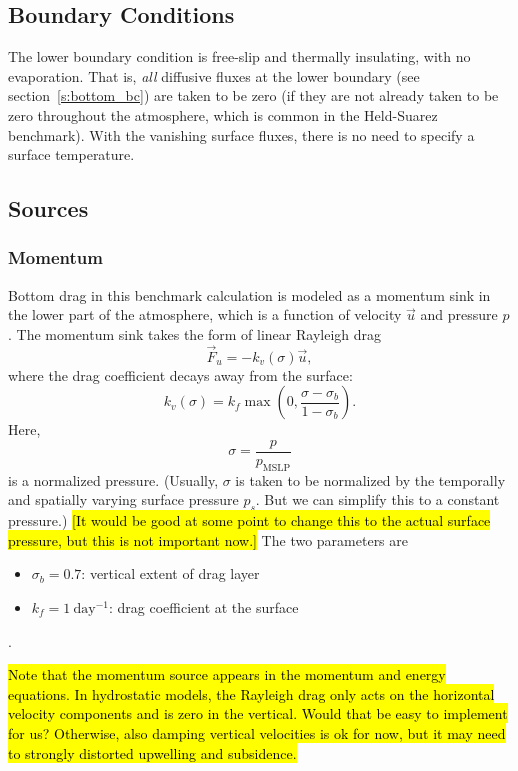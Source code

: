 \documentclass{report}
\begin{document}
\subsection{Boundary Conditions}

The lower boundary condition is free-slip and thermally insulating, with no evaporation. That is, \emph{all} diffusive fluxes at the lower boundary (see section~\ref{s:bottom_bc}) are taken to be zero (if they are not already taken to be zero throughout the atmosphere, which is common in the Held-Suarez benchmark). With the vanishing surface fluxes, there is no need to specify a surface temperature.

\subsection{Sources}

\subsubsection{Momentum} 

Bottom drag in this benchmark calculation is modeled as a momentum sink in the lower part of the atmosphere, which is a function of velocity $\vec{u}$ and pressure $p$. The momentum sink takes the form of linear Rayleigh drag
\begin{equation}
    \vec{F}_u = -k_v(\sigma) \vec{u},
\end{equation}
where the drag coefficient decays away from the surface:
\begin{equation}
    k_v(\sigma) = k_f \max \left( 0, \frac{\sigma - \sigma_b}{1-\sigma_b} \right).
\end{equation}
Here,
\[
\sigma = \frac{p}{p_{\mathrm{MSLP}}}
\]
is a normalized pressure. (Usually, $\sigma$ is taken to be normalized by the temporally and spatially varying surface pressure $p_s$. But we can simplify this to a constant pressure.) \hl{[It would be good at some point to change this to the actual surface pressure, but this is not important now.]} The two parameters are
\begin{itemize}
    \item $\sigma_b = 0.7$: vertical extent of drag layer
    \item $k_f = 1~\mathrm{day^{-1}}$: drag coefficient at the surface
\end{itemize}.

\hl{Note that the momentum source appears in the momentum and energy equations. In hydrostatic models, the Rayleigh drag only acts on the horizontal velocity components and is zero in the vertical. Would that be easy to implement for us? Otherwise, also damping vertical velocities is ok for now, but it may need to strongly distorted upwelling and subsidence.}
\end{document}
